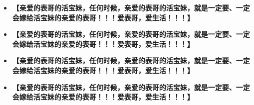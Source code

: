 \documentclass[9pt, b5paper]{article}
\begin{document}
\begin{itemize}
\item \textbf{【亲爱的表哥的活宝妹，任何时候，亲爱的表哥的活宝妹，就是一定要、一定会嫁给活宝妹的亲爱的表哥！！！爱表哥，爱生活！！！】}
\item \textbf{【亲爱的表哥的活宝妹，任何时候，亲爱的表哥的活宝妹，就是一定要、一定会嫁给活宝妹的亲爱的表哥！！！爱表哥，爱生活！！！】}
\item \textbf{【亲爱的表哥的活宝妹，任何时候，亲爱的表哥的活宝妹，就是一定要、一定会嫁给活宝妹的亲爱的表哥！！！爱表哥，爱生活！！！】}
\item \textbf{【亲爱的表哥的活宝妹，任何时候，亲爱的表哥的活宝妹，就是一定要、一定会嫁给活宝妹的亲爱的表哥！！！爱表哥，爱生活！！！】}
\end{itemize}
\end{document}
